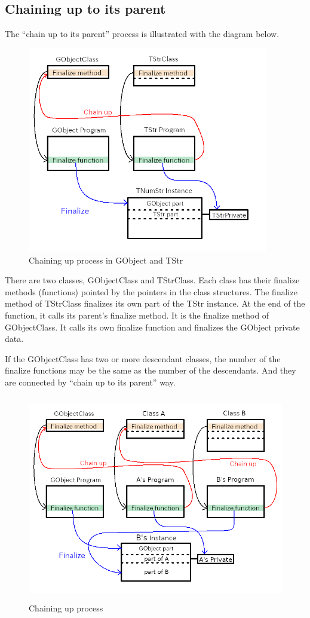 \subsection{Chaining up to its parent}\label{chaining-up-to-its-parent}

The ``chain up to its parent'' process is illustrated with the diagram
below.

\begin{figure}
\centering
\includegraphics[width=10.5cm,height=9cm]{../image/chainup.png}
\caption{Chaining up process in GObject and TStr}
\end{figure}

There are two classes, GObjectClass and TStrClass. Each class has their
finalize methods (functions) pointed by the pointers in the class
structures. The finalize method of TStrClass finalizes its own part of
the TStr instance. At the end of the function, it calls its parent's
finalize method. It is the finalize method of GObjectClass. It calls its
own finalize function and finalizes the GObject private data.

If the GObjectClass has two or more descendant classes, the number of
the finalize functions may be the same as the number of the descendants.
And they are connected by ``chain up to its parent'' way.

\begin{figure}
\centering
\includegraphics[width=12cm,height=9cm]{../image/chainup3.png}
\caption{Chaining up process}
\end{figure}

